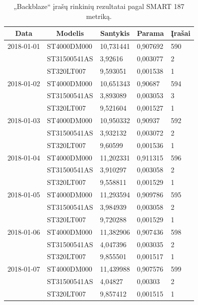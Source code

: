 \documentclass{VUMIFPSkursinis}
\begin{document}
\begin{table}[H]
\centering
\caption{„Backblaze“ įrašų rinkinių rezultatai pagal SMART 187 metriką.}
\label{tab:rez187}
{\begin{tabular}{|l|l|l|l|l|}
\hline
\multicolumn{1}{|c|}{\textbf{Data}} & \multicolumn{1}{c|}{\textbf{Modelis}} & \multicolumn{1}{c|}{\textbf{Santykis}} & \multicolumn{1}{c|}{\textbf{Parama}} & \multicolumn{1}{c|}{\textbf{Įrašai}} \\ \hline
2018-01-01               & ST4000DM000  & 10,731441 & 0,907692 & 590    \\ \hline
\cellcolor[HTML]{C0C0C0} & ST31500541AS & 3,92616   & 0,003077 & 2      \\ \hline
\cellcolor[HTML]{C0C0C0} & ST320LT007   & 9,593051  & 0,001538 & 1      \\ \hline
2018-01-02               & ST4000DM000  & 10,651343 & 0,90687  & 594    \\ \hline
\cellcolor[HTML]{C0C0C0} & ST31500541AS & 3,893089  & 0,003053 & 3      \\ \hline
\cellcolor[HTML]{C0C0C0} & ST320LT007   & 9,521604  & 0,001527 & 1      \\ \hline
2018-01-03               & ST4000DM000  & 10,950332 & 0,90937  & 592    \\ \hline
\cellcolor[HTML]{C0C0C0} & ST31500541AS & 3,932132  & 0,003072 & 2      \\ \hline
\cellcolor[HTML]{C0C0C0} & ST320LT007   & 9,60599   & 0,001536 & 1      \\ \hline
2018-01-04               & ST4000DM000  & 11,202331 & 0,911315 & 596    \\ \hline
\cellcolor[HTML]{C0C0C0} & ST31500541AS & 3,910297  & 0,003058 & 2      \\ \hline
\cellcolor[HTML]{C0C0C0} & ST320LT007   & 9,558811  & 0,001529 & 1      \\ \hline
2018-01-05               & ST4000DM000  & 11,293594 & 0,909786 & 595    \\ \hline
\cellcolor[HTML]{C0C0C0} & ST31500541AS & 3,984939  & 0,003058 & 2      \\ \hline
\cellcolor[HTML]{C0C0C0} & ST320LT007   & 9,720288  & 0,001529 & 1      \\ \hline
2018-01-06               & ST4000DM000  & 11,382906 & 0,907436 & 598    \\ \hline
\cellcolor[HTML]{C0C0C0} & ST31500541AS & 4,047396  & 0,003035 & 2      \\ \hline
\cellcolor[HTML]{C0C0C0} & ST320LT007   & 9,855501  & 0,001517 & 1      \\ \hline
2018-01-07               & ST4000DM000  & 11,439988 & 0,907576 & 599    \\ \hline
\cellcolor[HTML]{C0C0C0} & ST31500541AS & 4,04827   & 0,00303  & 2      \\ \hline
\cellcolor[HTML]{C0C0C0} & ST320LT007   & 9,857412  & 0,001515 & 1      \\ \hline
\end{tabular}}
\end{table}
\end{document}
